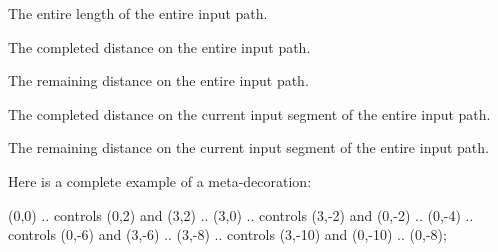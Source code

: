 \begin{command}{\pgfdeclaremetadecorate{}}
\begin{command}{\state{}}
        \begin{command}{\pgfmetadecoratedpathlength}
            The entire length of the entire input path.
        \end{command}

        \begin{command}{\pgfmetadecoratedcompleteddistance}
            The completed distance on the entire input path.
        \end{command}

        \begin{command}{\pgfmetadecoratedremainingdistance}
            The remaining distance on the entire input path.
        \end{command}

        \begin{command}{\pgfmetadecoratedinputsegmentcompleteddistance}
            The completed distance on the current input segment of the entire
            input path.
        \end{command}

        \begin{command}{\pgfmetadecoratedinputsegmentremainingdistance}
            The remaining distance on the current input segment of the entire
            input path.
        \end{command}
    \end{command}

    Here is a complete example of a meta-decoration:
\begin{codeexample}[]

\tikz\draw[decorate,decoration={arrows,meta-segment length=2cm}]
  (0,0) .. controls (0,2)   and (3,2)   .. (3,0)
        .. controls (3,-2)  and (0,-2)  .. (0,-4)
        .. controls (0,-6)  and (3,-6)  .. (3,-8)
        .. controls (3,-10) and (0,-10) .. (0,-8);
\end{codeexample}
\end{command}


